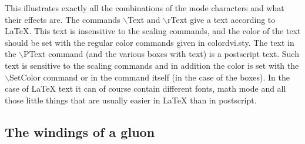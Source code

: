 This illustrates exactly all the combinations of the mode characters and 
what their effects are. The commands $\backslash$Text and 
$\backslash$rText give a text according to \LaTeX{}. This text is 
insensitive to the scaling commands, and the color of the text should be 
set with the regular color commands given in colordvi.sty. The text in the 
$\backslash$PText command (and the various boxes with text) is a postscript 
text. Such text is sensitive to the scaling commands and in addition the 
color is set with the $\backslash$SetColor command or in the command itself 
(in the case of the boxes). In the case of \LaTeX{} text 
it can of course contain different fonts, 
math mode and all those little things that are usually easier in 
\LaTeX{} than in postscript.

\subsection{The windings of a gluon}

